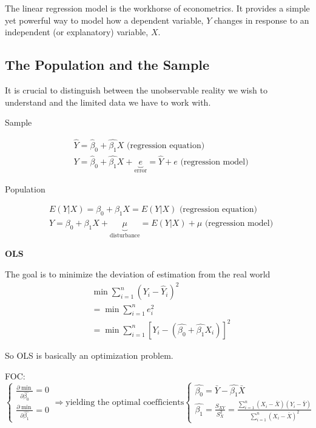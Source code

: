 \documentclass{article}
\begin{document}
The linear regression model is the workhorse of econometrics. It provides a simple yet powerful way to model how a dependent variable, $Y$ changes in response to an independent (or explanatory) variable, $X$.

\subsection{The Population and the Sample}

It is crucial to distinguish between the unobservable reality we wish to understand and the limited data we have to work with.

Sample

\begin{align}
  &\hat Y =\hat \beta_0 +\hat{\beta_{1}}X \text{ (regression equation)}
  \\& Y=\hat \beta_0 +\hat{\beta_{1}}X+
  \underbrace{e}_\text{error}
  =\hat Y + e
  \text{ (regression model)}
\end{align}


Population

\begin{align}
& E(Y|X)=\beta_{0}+\beta_{1} X =E(Y|X) \text{ (regression equation)}
\\& Y= \beta_{0}+\beta_{1}X+\underbrace{\mu}_\text{disturbance}=E(Y|X)+\mu \text{ (regression model)}
\end{align}


\textbf{OLS}

The goal is to minimize the deviation of estimation from the real world
\begin{align}
  & \min \sum\limits_{i=1}^n (Y_i-\hat Y_i)^2
  \\& =\min \sum\limits_{i=1}^n e_i^2
  \\& =\min \sum\limits_{i=1}^n [Y_i-(\hat{\beta_{0}}+\hat{\beta_{1}}X_i)]^2
\end{align}

So OLS is basically an optimization problem.

FOC:
$\begin{cases}
\frac{\partial \min}{\partial \hat{\beta_{0}}}=0
\\
\frac{\partial \min}{\partial \hat{\beta_{1}}}=0
\end{cases} \Rightarrow
\text{yielding the optimal coefficients}
\begin{cases}
\hat{\beta_{0}}=\bar Y-\hat{\beta_{1}}\bar X
\\
\hat{\beta_{1}}=\frac{S_{XY}}{S^2_X}=\frac{\sum\limits_{i=1}^n (X_i-\bar X)(Y_i-\bar Y)}{\sum\limits_{i=1}^n (X_i-\bar X)^2}
\end{cases}$
\end{document}
